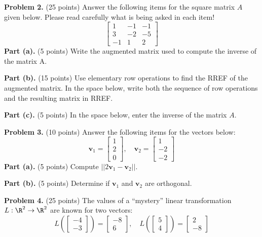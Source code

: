 \documentclass[12pt]{article}
\begin{document}
\textbf{Problem 2.} (25 points) Answer the following items for the square matrix $A$ given below. Please read carefully what is being asked in each item!
\[
\left[\begin{matrix}1 & -1 & -1\\3 & -2 & -5\\-1 & 1 & 2\end{matrix}\right]
\]
\textbf{Part (a).} (5 points) Write the augmented matrix used to compute the inverse of the matrix A.

\vskip1in

\textbf{Part (b).} (15 points) Use elementary row operations to find the RREF of the augmented matrix.
In the space below, write both the sequence of row operations and the resulting matrix in RREF.

\vskip3.5in

\textbf{Part (c).} (5 points) In the space below, enter the inverse of the matrix $A$.

\clearpage

\textbf{Problem 3.} (10 points) Answer the following items for the vectors below:
\[
\mathbf{v}_1=\left[\begin{matrix}1\\2\\0\end{matrix}\right],\quad
\mathbf{v}_2=\left[\begin{matrix}1\\-2\\-2\end{matrix}\right]
\]
\textbf{Part (a).} (5 points) Compute $||2\textbf{v}_1-\textbf{v}_2||$.

\vskip3.5in

\textbf{Part (b).} (5 points) Determine if $\textbf{v}_1$ and $\textbf{v}_2$ are orthogonal.

\clearpage

\textbf{Problem 4.} (25 points) The values of a ``mystery'' linear transformation $L:\R^2\to\R^2$ are known for two vectors:
\[
L\left(\left[\begin{matrix}-4\\-3\end{matrix}\right]\right)=\left[\begin{matrix}-8\\6\end{matrix}\right],\quad L\left(\left[\begin{matrix}5\\4\end{matrix}\right]\right)=\left[\begin{matrix}2\\-8\end{matrix}\right]
\]
\end{document}
